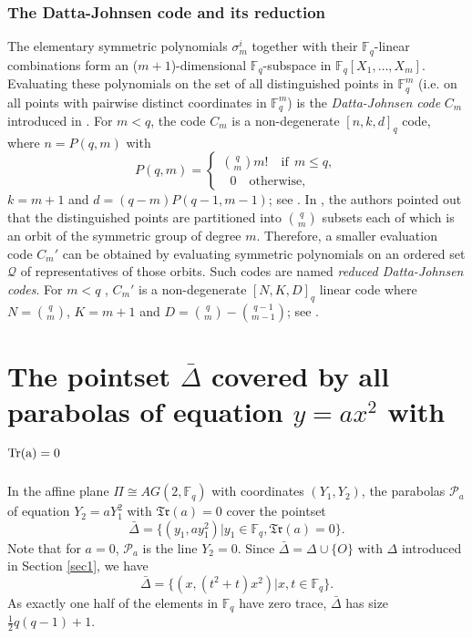 \documentclass[sn-mathphys-num]{sn-jnl}%
\begin{document}
\subsubsection{The Datta-Johnsen code and its reduction}
\label{dj}The elementary symmetric polynomials $\sigma_m^i$ together with their $\mathbb{F}_q$-linear combinations form an ($m+1$)-dimensional $\mathbb{F}_q$-subspace in $\mathbb{F}_q[X_1,\ldots,X_m]$. Evaluating these polynomials on the set of all distinguished points in $\mathbb{F}_q^m$ (i.e. on all points with pairwise distinct coordinates in $\mathbb{F}_q^m$) is the \emph{Datta-Johnsen code} $C_m$ introduced in \cite{datta2023codes}. For $m < q$, the code $C_m$ is a non-degenerate $[n,k,d]_q$ code, where $n =P(q,m)$ with
\begin{equation*}
P(q,m)=
\begin{cases}
\binom{q}{m} m! \quad \text{if} \ \ m \le q,\\
\,\,\,\,0 \quad \text{otherwise},
\end{cases}
\end{equation*} $k=m+1$ and $d =(q-m)P(q-1,m-1)$; see \cite[Proposition 3.2]{datta2023codes}. In \cite[Remark 3.3]{datta2023codes}, the authors pointed out that the distinguished points are partitioned into $\binom{q}{m}$ subsets each of which is an orbit of the symmetric group of degree $m$. Therefore, a smaller evaluation code $C_m'$ can be obtained by evaluating symmetric polynomials on an ordered set $\mathcal{Q}$ of representatives of those orbits. Such codes are named \emph{reduced Datta-Johnsen codes}. For $m < q$ , $C_m'$ is a non-degenerate $[N, K, D]_q$ linear code where $N = \binom{q}{m}$, $K=m+1$ and $D=\binom{q}{m}- \binom{q-1}{m-1}$; see \cite[Proposition 3.4]{datta2023codes}.
\section{The pointset $\bar{\Delta}$ covered by all parabolas of equation $y=ax^2$ with $\rm{Tr}(a)=0$}\label{dede}


In the affine plane $\Pi\cong AG(2,\mathbb{F}_q)$ with coordinates $(Y_1,Y_2)$, the parabolas $\mathcal{P}_a$ of equation $Y_2=aY_1^2$ with $\mathfrak{Tr}(a)=0$ cover the pointset
\begin{equation}
    \label{delta}
   \bar{\Delta}=\{(y_1,a y_1^2)|y_1\in\mathbb{F}_q, \mathfrak{Tr}(a)=0\}.
\end{equation}
Note that for $a=0$, $\mathcal{P}_a$ is the line $Y_2=0$. Since $\bar{\Delta}=\Delta\cup \{O\}$ with $\Delta$ introduced in Section \ref{sec1}, we have
\begin{equation*}\label{delta2}
     \bar{\Delta}=\{(x,(t^2+t) x^2)|x,t\in\mathbb{F}_q\}.
     \end{equation*}
As exactly one half of the elements in $\mathbb{F}_q$ have zero trace, $\bar{\Delta}$ has size $\frac{1}{2} q(q-1)+1$.
\end{document}
